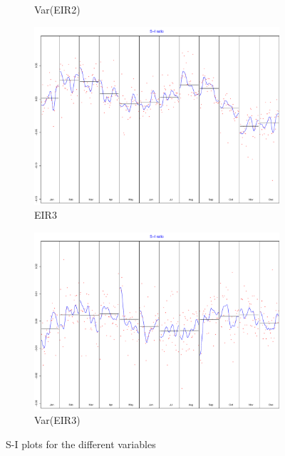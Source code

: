 \documentclass[12pt,a4paper,oneside]{book}
\begin{document}
\begin{figure}
\begin{subfigure}{.5\textwidth}
  \caption{Var(EIR2)}
\end{subfigure}
\begin{subfigure}{.5\textwidth}
  \centering
  \includegraphics[width=.8\linewidth]{Graphs/S-I_7.pdf}
  \caption{EIR3}
\end{subfigure}
\begin{subfigure}{.5\textwidth}
  \centering
  \includegraphics[width=.8\linewidth]{Graphs/S-I_8.pdf}
  \caption{Var(EIR3)}
\end{subfigure}
\caption{S-I plots for the different variables}
\label{fig:S-I seasonal correction RJDemetra}
\end{figure}


\newpage
\end{document}
